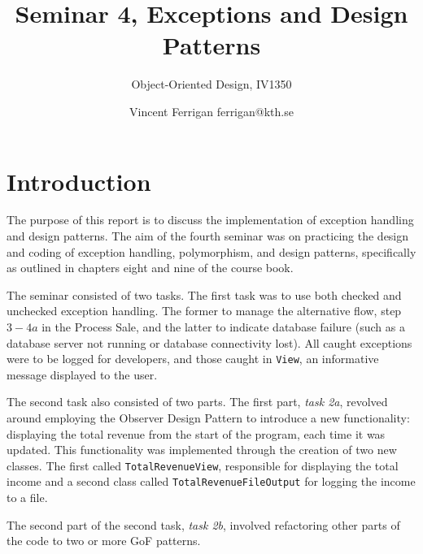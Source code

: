 \documentclass[a4paper]{scrreprt}
\title{Seminar 4, Exceptions and Design Patterns}
\subtitle{Object-Oriented Design, IV1350}
\author{Vincent Ferrigan ferrigan@kth.se}
\begin{document}
\maketitle

\tableofcontents %

\chapter{Introduction}
The purpose of this report is to discuss the implementation of exception handling
and design patterns.
The aim of the fourth seminar was on practicing the design
and coding of exception handling, polymorphism, and design patterns,
specifically as outlined in chapters eight and nine of the course book.

The seminar consisted of two tasks.
The first task was to use both checked and
unchecked exception handling.
The former to manage the alternative flow, step $3-4a$
in the Process Sale, and the latter to indicate database failure (such as a
database server not running or database connectivity lost).
All caught exceptions were to be logged for developers, and those caught
in \verb|View|, an informative message displayed to the user.

The second task also consisted of two parts.
The first part, \emph{task 2a}, revolved
around employing the Observer Design Pattern to introduce a new functionality:
displaying the total revenue from the start of the program, each time it was
updated.
This functionality was implemented through the creation of two new
classes.
The first called \texttt{TotalRevenueView}, responsible for displaying the
total income and a second class called \texttt{TotalRevenueFileOutput} for logging the
income to a file.

The second part of the second task, \emph{task 2b}, involved refactoring other parts of
the code to two or more GoF patterns.
\end{document}
